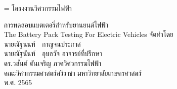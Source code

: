 {\centering
\parskip=\baselineskip
\renewcommand{\baselinestretch}{0}
\fontsize{12pt}{0}
{\fontsize{14pt}{0}\selectfont โครงงานวิศวกรรมไฟฟ้า}


{\fontsize{14pt}{0}\selectfont การทดสอบแบตเตอรี่สำหรับยานยนต์ไฟฟ้า\\The Battery Pack Testing For Electric Vehicles}
\vfill
จัดทำโดย\\
นายณัฐนนท์\ \ กาญจนประภาส\\
นายณัฐนันท์\ \ อุบลวัจ
\vfill
อาจารย์ที่ปรึกษา\\ดร.วสันต์ ตันเจริญ
\vfill
ภาควิศวกรรมไฟฟ้า\\คณะวิศวกรรมศาสตร์ศรีราชา มหาวิทยาลัยเกษตรศาสตร์\\พ.ศ. 2565\par}
%
%
%
%

